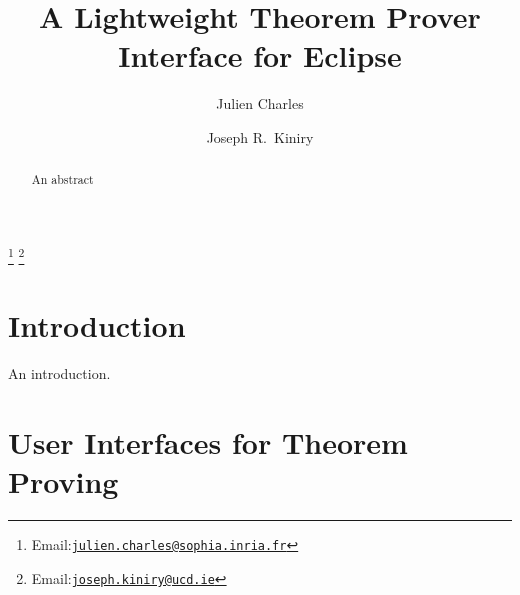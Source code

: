 \documentclass{entcs}
\begin{document}
\begin{frontmatter}

\title{A Lightweight Theorem Prover Interface for Eclipse}

\author{Julien Charles}

\address{Everest Group\\
  INRIA Sophia Antipolis\\
  2004 Route des Lucioles - BP 93\\
  FR-06902 Sophia Antipolis, France}

\author{Joseph R.~Kiniry}

\address{Systems Research Group\\
  School of Computer Science and Informatics\\
  University College Dublin\\
  Belfield, Dublin 4, Ireland}

\thanks[charles]{Email:\href{mailto:julien.charles@sophia.inria.fr}
  {\texttt{\normalshape julien.charles@sophia.inria.fr}}}
\thanks[kiniry]{Email:\href{mailto:joseph.kiniry@ucd.ie}
  {\texttt{\normalshape joseph.kiniry@ucd.ie}}}

\maketitle

\thispagestyle{empty}
\begin{abstract}

  An abstract  

\end{abstract}

\end{frontmatter}

\section{Introduction}

An introduction.

\section{User Interfaces for Theorem Proving}

\end{document}
